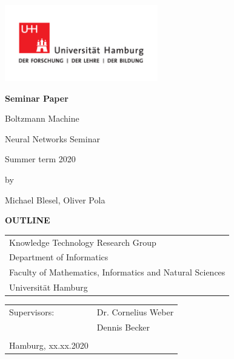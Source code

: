 \documentclass[
	12pt,
	a4paper,
	BCOR10mm,
	DIV14,
	headsepline,
	usegeometry,
]{scrreprt}
\begin{document}

\begin{titlepage}
	\includegraphics[width=0.5\textwidth]{fig/UHH-Logo_2010_Farbe_CMYK}

	\begin{center}
		{\Large \textcolor{uhhred}{\textbf{Seminar Paper}}\par}

		\vspace{1cm}

		{\titlefont\huge Boltzmann Machine\par}

		\vspace{1cm}

		{\large Neural Networks Seminar\par}

		\vspace{1cm}

		{\large Summer term 2020\par}

		\vspace{1cm}

		{\large by\par}

		\vspace{0.5cm}

		{\large Michael Blesel, Oliver Pola\par}
		
		\vspace{2cm}
		{\huge\textcolor{uhhred}{\textbf{OUTLINE}}}
	\end{center}

	\vfill

	{\large\noindent\begin{tabular}{l}
		Knowledge Technology Research Group\\
		Department of Informatics\\
		Faculty of Mathematics, Informatics and Natural Sciences\\
		Universität Hamburg
	\end{tabular}\par}

	\vspace{1cm}

	{\large\noindent\begin{tabular}{ll}
		Supervisors:    		& Dr. Cornelius Weber\\
						& Dennis Becker\\
		\\
		Hamburg, xx.xx.2020
	\end{tabular}\par}
\end{titlepage}
\end{document}
